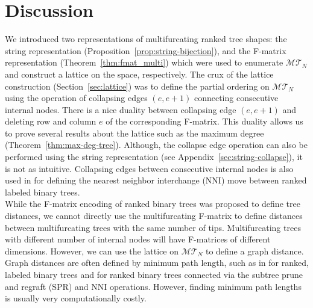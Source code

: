 \documentclass{article}
\begin{document}
\section{Discussion} \label{sec:discussion}

We introduced two representations of multifurcating ranked tree shapes: the string representation (Proposition~\ref{prop:string-bijection}), and the F-matrix representation (Theorem~\ref{thm:fmat_multi}) which were used to enumerate $\mathcal{MT}_N$ and construct a lattice on the space, respectively. The crux of the lattice construction (Section~\ref{sec:lattice}) was to define the partial ordering on $\mathcal{MT}_N$ using the operation of collapsing edges $(e,e+1)$ connecting consecutive internal nodes. There is a nice duality between collapsing edge $(e,e+1)$ and deleting row and column $e$ of the corresponding F-matrix. This duality allows us to prove several results about the lattice such as the maximum degree (Theorem~\ref{thm:max-deg-tree}). Although, the collapse edge operation can also be performed using the string representation (see Appendix~\ref{sec:string-collapse}),  it is not as intuitive. Collapsing edges between consecutive internal nodes is also used in \cite{collienne2021computing} for defining the nearest neighbor interchange (NNI) move between ranked labeled binary trees. \\ 

While the F-matrix encoding of ranked binary trees was proposed to define tree distances, we cannot directly use the multifurcating F-matrix to define distances between multifurcating trees with the same number of tips. Multifurcating trees with different number of internal nodes will have F-matrices of different dimensions. However, we can use the lattice on $\mathcal{MT}_N$ to define a graph distance. Graph distances are often defined by minimum path length, such as in \cite{collienne2021computing} for ranked, labeled binary trees and \cite{collienne2024ranked} for ranked binary trees connected via the subtree prune and regraft (SPR) and NNI operations. However, finding minimum path lengths is usually very computationally costly. \\
\end{document}

